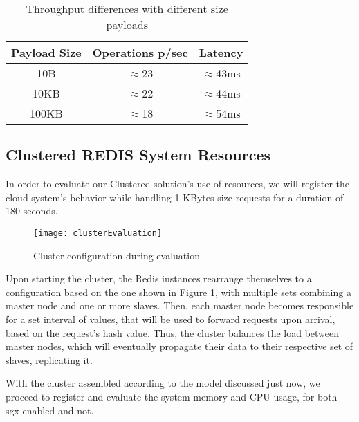 \begin{table}[ht]
	\caption{Throughput differences with different size payloads} %
	\centering %
	\begin{tabular}{c c c } %
		\hline\hline %
		\textbf{Payload Size} & \textbf{Operations p/sec} & \textbf{Latency}\\ [0.5ex] %
		\hline
		10B & $\approx$23 & $\approx$43ms\\
		\hline
		10KB & $\approx$22 & $\approx$44ms\\
		\hline %
		100KB & $\approx$18 & $\approx$54ms\\ [1ex] %
		\hline %
	\end{tabular}
	\label{table:throughputPayloadsCluster} %
\end{table} 




\subsection{Clustered REDIS System Resources}

In order to evaluate our Clustered solution's use of resources, we will register the cloud system's behavior while handling 1 KBytes size requests for a duration of 180 seconds.

\begin{figure}[htbp]
	\centering
	{\texttt{[image: clusterEvaluation]}}
	\caption{Cluster configuration during evaluation}
	\label{fig:clusterLayout}
\end{figure} 

Upon starting the cluster, the Redis instances rearrange themselves to a configuration based on the one shown in Figure \ref{fig:clusterLayout}, with multiple sets combining a master node and one or more slaves. Then, each master node becomes responsible for a set interval of values, that will be used to forward requests upon arrival, based on the request's hash value. Thus, the cluster balances the load between master nodes, which will eventually propagate their data to their respective set of slaves, replicating it.
 
With the cluster assembled according to the model discussed just now, we proceed to register and evaluate the system memory and CPU usage, for both \gls{sgx}-enabled and not.

